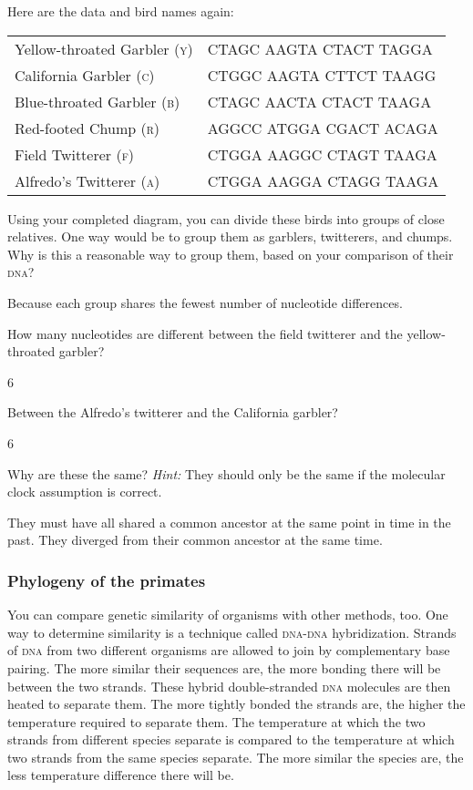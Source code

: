 \documentclass[12pt, addpoints]{exam}
\newcommand*\AnswerBox[2]{%
    \parbox[t][#1]{0.92\textwidth}{%
    \begin{solution}#2\end{solution}}
}
\begin{document}
\begin{questions}
Here are the data and bird names again:

\begin{longtable}[c]{@{}ll@{}}
\toprule
Yellow-throated Garbler \textsc{(y)} & {\ttfamily CTAGC AAGTA CTACT TAGGA}\tabularnewline
California Garbler \textsc{(c)} & {\ttfamily CTGGC AAGTA CTTCT TAAGG}\tabularnewline
Blue-throated Garbler \textsc{(b)} & {\ttfamily CTAGC AACTA CTACT TAAGA}\tabularnewline
Red-footed Chump \textsc{(r)} & {\ttfamily AGGCC ATGGA CGACT ACAGA}\tabularnewline
Field Twitterer \textsc{(f)} & {\ttfamily CTGGA AAGGC CTAGT TAAGA}\tabularnewline
Alfredo's Twitterer \textsc{(a)} & {\ttfamily CTGGA AAGGA CTAGG TAAGA}\tabularnewline
\bottomrule
\end{longtable}

\question[3]
Using your completed diagram, you can divide these
birds into groups of close relatives. One way would be to group them as
garblers, twitterers, and chumps. Why is this a reasonable way
to group them, based on your comparison of their \textsc{dna}?

\AnswerBox{3\baselineskip}{%
Because each group shares the fewest number of nucleotide differences.
}

\question[1]
How many nucleotides are different between the field
twitterer and the yellow-throated garbler?

\AnswerBox{0.5\baselineskip}{6}

\question[1]
Between the Alfredo's twitterer and the California garbler?

\AnswerBox{0.5\baselineskip}{6}

\question[3]
Why are these the same? \emph{Hint:} They should only be the same if
the molecular clock assumption is correct.

\AnswerBox{1\baselineskip}{%
They must have all shared a common ancestor at the same point in time in the past. They diverged from their common ancestor at the same time.
}

\newpage

\subsubsection*{Phylogeny of the primates}

You can compare genetic similarity of organisms with other methods, too. One 
way to determine similarity is a technique called \textsc{dna-dna} hybridization.
Strands of \textsc{dna}  from two different organisms 
are allowed to join by complementary base
pairing. The more similar their sequences are, the more bonding there
will be between the two strands. These hybrid double-stranded \textsc{dna} molecules are
then heated to separate them. The more tightly bonded the strands are, the
higher the temperature required to separate them. The temperature at
which the two strands from different species separate is compared to the
temperature at which two strands from the same species separate. The more similar
the species are, the less temperature difference there will be. 


\end{questions}
\end{document}
